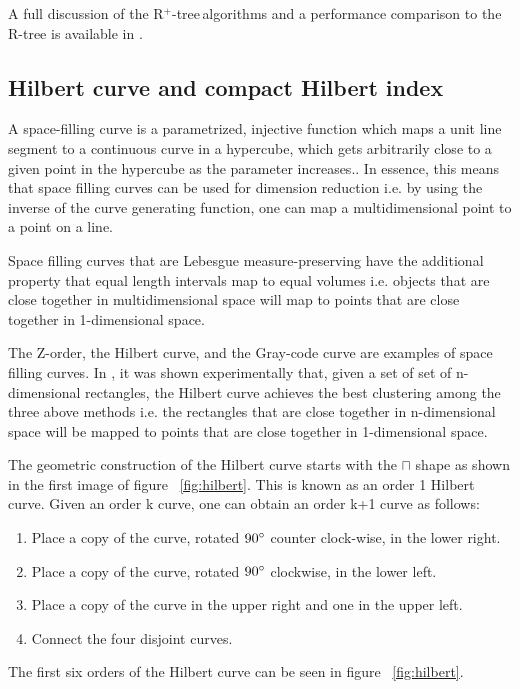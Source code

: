 \documentclass[11pt, a4paper, oneside]{article}
\newcommand{\rplus}{R$^+$-tree$\,$}
\begin{document}
A full discussion of the \rplus algorithms and a performance comparison to the R-tree is available in \cite{Sellis:1987:RDI:645914.671636}. 

\subsection{Hilbert curve and compact Hilbert index}
A space-filling curve is a parametrized, injective function which maps a unit line segment to a continuous curve in a hypercube, which gets arbitrarily close to a given point in the hypercube as the parameter increases.\cite{MR1299533}. In essence, this means that space filling curves can be used for dimension reduction i.e. by using the inverse of the curve generating function, one can map a multidimensional point to a point on a line.

Space filling curves that are Lebesgue measure-preserving have the additional property that equal length intervals map to equal volumes i.e. objects that are close together in multidimensional space will map to points that are close together in 1-dimensional space.

The Z-order, the Hilbert curve, and the Gray-code curve\cite{Faloutsos:1988:GCP:53064.53065} are examples of space filling curves. In \cite{Faloutsos:1989:FSK:73721.73746}, it was shown experimentally that, given a set of set of n-dimensional rectangles, the Hilbert curve achieves the best clustering among the three above methods i.e. the rectangles that are close together in n-dimensional space will be mapped to points that are close together in 1-dimensional space.

The geometric construction of the Hilbert curve starts with the $\sqcap$ shape as shown in the first image of figure ~\ref{fig:hilbert}. This is known as an order 1 Hilbert curve. Given an order k curve, one can obtain an order k+1 curve as follows:
\begin{enumerate}
\item Place a copy of the curve, rotated $90\degree$ counter clock-wise, in the lower right.
\item Place a copy of the curve, rotated $90\degree$ clockwise, in the lower left.
\item Place a copy of the curve in the upper right and one in the upper left.
\item Connect the four disjoint curves.
\end{enumerate} 

The first six orders of the Hilbert curve can be seen in figure ~\ref{fig:hilbert}.
\end{document}
